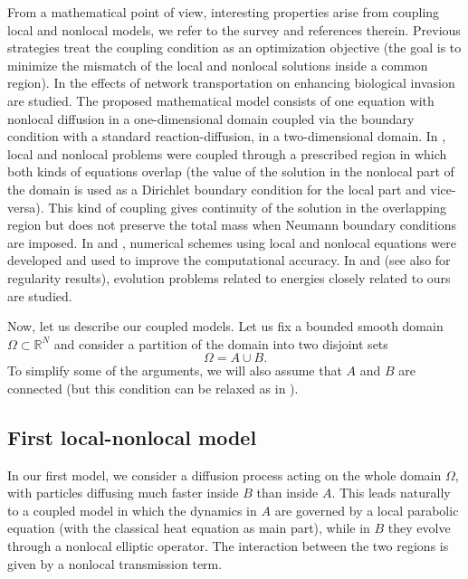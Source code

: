 \documentclass[reqno]{amsart}
\numberwithin{equation}{section}
\begin{document}
From a mathematical point of view, interesting properties arise from coupling local and nonlocal models, 
we refer to \cite{Peri1,Peri2,Peri3,monia,DEliaPeregoBochevLittlewood16,DuLiLuTian18,delia3,GalWarma17,Han,Kriventsov15,Sel,Sel2,Sel3}
the survey \cite{SUR} and references therein. 
Previous strategies treat the coupling condition as an optimization objective (the goal is to minimize the mismatch of the local and nonlocal solutions inside a common region). In \cite{Bere} the effects of network transportation on enhancing biological invasion are studied. The proposed mathematical model consists of one equation with nonlocal diffusion in a one-dimensional domain coupled via the boundary condition with a standard reaction-diffusion, in a two-dimensional domain. 
In \cite{DEliaPeregoBochevLittlewood16}, local and nonlocal problems were coupled through a prescribed region in which both kinds of equations overlap (the value of the solution in the nonlocal part of the domain is used as a Dirichlet boundary condition for the local part and vice-versa). This kind of coupling gives continuity of the solution in the overlapping region but does not preserve the total mass when Neumann boundary conditions are imposed.
In \cite{DEliaPeregoBochevLittlewood16} and \cite{DuLiLuTian18}, numerical schemes using local and nonlocal equations were developed and used to improve the computational
accuracy. In \cite{quiros} and \cite{monia} (see also \cite{Kriventsov15} for regularity results), 
evolution problems related to energies closely related to ours are studied.


Now, let us describe our coupled models. Let us fix a bounded smooth domain $\Omega\subset \mathbb{R}^N$ and consider a partition of the domain into two disjoint sets
\[ \Omega = A \cup B. \]
To simplify some of the arguments, we will also assume that $A$ and $B$ are connected (but this condition can be relaxed as in \cite{acosta}). 

\subsection{First local-nonlocal model}
In our first model, we consider a diffusion process acting on the whole domain $\Omega$, with particles diffusing much faster inside $B$ than inside $A$. This leads naturally to a coupled model in which the dynamics in $A$ are governed by a local parabolic equation (with the classical heat equation as main part), while in $B$ they evolve through a nonlocal elliptic operator. The interaction between the two regions is given by a nonlocal transmission term.
\end{document}
